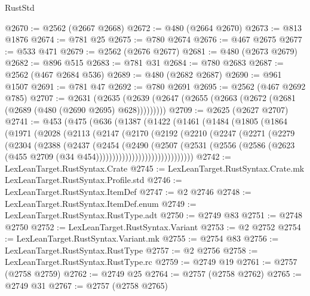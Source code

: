 \begin{lexlean}{RustStd}
\begin{coremodule}
{\begin{coremodule}
{{{{{{{{{{{{{{{{{{{{{{{{{{{{{{{{{@2670 := @2562 (@2667 @2668)
@2672 := @480 (@2664 @2670)
@2673 := @813 @1876
@2674 := @781 @25
@2675 := @780 @2674
@2676 := @467 @2675
@2677 := @533 @471
@2679 := @2562 (@2676 @2677)
@2681 := @480 (@2673 @2679)
@2682 := @896 @515
@2683 := @781 @31
@2684 := @780 @2683
@2687 := @2562 (@467 @2684 @536)
@2689 := @480 (@2682 @2687)
@2690 := @961 @1507
@2691 := @781 @47
@2692 := @780 @2691
@2695 := @2562 (@467 @2692 @785)
@2707 := @2631
    (@2635 (@2639 (@2647 (@2655 (@2663 (@2672 (@2681 (@2689 (@480 (@2690 @2695) @628)))))))))
@2709 := @2625 (@2627 @2707)
@2741 := @453
    (@475
      (@636
        (@1387
          (@1422
            (@1461
              (@1484
                (@1805
                  (@1864
                    (@1971
                      (@2028
                        (@2113
                          (@2147
                            (@2170
                              (@2192
                                (@2210
                                  (@2247
                                    (@2271
                                      (@2279
                                        (@2304
                                          (@2388
                                            (@2437
                                              (@2454
                                                (@2490
                                                  (@2507
                                                    (@2531
                                                      (@2556
                                                        (@2586
                                                          (@2623
                                                            (@455
                                                              @2709
                                                              (@34
                                                                @454))))))))))))))))))))))))))))))
@2742 := LexLeanTarget.RustSyntax.Crate
@2745 := LexLeanTarget.RustSyntax.Crate.mk LexLeanTarget.RustSyntax.Profile.std
@2746 := LexLeanTarget.RustSyntax.ItemDef
@2747 := @2 @2746
@2748 := LexLeanTarget.RustSyntax.ItemDef.enum
@2749 := LexLeanTarget.RustSyntax.RustType.adt
@2750 := @2749 @83
@2751 := @2748 @2750
@2752 := LexLeanTarget.RustSyntax.Variant
@2753 := @2 @2752
@2754 := LexLeanTarget.RustSyntax.Variant.mk
@2755 := @2754 @83
@2756 := LexLeanTarget.RustSyntax.RustType
@2757 := @2 @2756
@2758 := LexLeanTarget.RustSyntax.RustType.rc
@2759 := @2749 @19
@2761 := @2757 (@2758 @2759)
@2762 := @2749 @25
@2764 := @2757 (@2758 @2762)
@2765 := @2749 @31
@2767 := @2757 (@2758 @2765)
}}}}}}}}}}}}}}}}}}}}}}}}}}}}}}}}}
\end{coremodule}}
\end{coremodule}
\end{lexlean}
